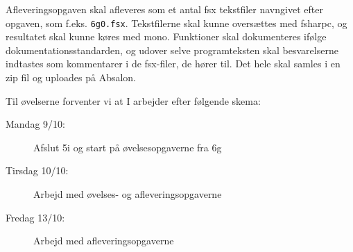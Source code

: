 \documentclass[a4paper,12pt]{article}
\begin{document}
Afleveringsopgaven skal afleveres som et antal fsx tekstfiler navngivet efter opgaven, som f.eks. \lstinline!6g0.fsx!. Tekstfilerne skal kunne oversættes med fsharpc, og resultatet skal kunne køres med mono. Funktioner skal dokumenteres ifølge dokumentationsstandarden, og udover selve programteksten skal besvarelserne indtastes som kommentarer i de fsx-filer, de hører til. Det hele skal samles i en zip fil og uploades på Absalon.

Til øvelserne forventer vi at I arbejder efter følgende skema:
\begin{description}
\item[Mandag 9/10:] Afslut 5i og start på øvelsesopgaverne fra 6g
\item[Tirsdag 10/10:] Arbejd med øvelses- og afleveringsopgaverne
\item[Fredag 13/10:]  Arbejd med afleveringsopgaverne
\end{description}
\end{document}
